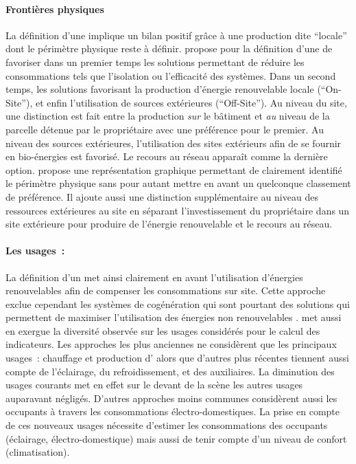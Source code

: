 \paragraph{Frontières physiques} %
\label{par:frontières_physiques}
La définition d’une  implique un bilan positif grâce à une production dite
\enquote{locale} dont le périmètre physique reste à définir.
\textcite{Torcellini2006} propose pour la définition d’une 
de favoriser dans un premier temps les solutions permettant de réduire les consommations
tels que l’isolation ou l’efficacité des systèmes. Dans un second temps, les solutions favorisant
la production d’énergie renouvelable locale (\enquote{On-Site}), et enfin
l’utilisation de sources extérieures (\enquote{Off-Site}). Au niveau du site, une
distinction est fait entre la production \emph{sur} le bâtiment et \emph{au} niveau de la
parcelle détenue par le propriétaire avec une préférence pour le premier.
Au niveau des sources extérieures, l’utilisation des sites extérieurs afin de se
fournir en bio-énergies est favorisé. Le recours au réseau apparaît comme la dernière option.
\textcite{Marszal2010} propose une représentation graphique permettant de clairement
identifié le périmètre physique sans pour autant mettre en avant un quelconque
classement de préférence. Il ajoute aussi une distinction supplémentaire au niveau
des ressources extérieures au site en séparant l’investissement du propriétaire dans
un site extérieure pour produire de l’énergie renouvelable et le recours au réseau.

\paragraph{Les usages~:} %
\label{par:les_usages}
La définition d’un  met ainsi clairement en avant l’utilisation d’énergies
renouvelables afin de compenser les consommations sur site. Cette approche exclue
cependant les systèmes de cogénération qui sont pourtant des solutions qui permettent
de maximiser l’utilisation des énergies non renouvelables \parencite{Sartori2010}.
\textcite{Marszal2011971} met aussi en exergue la diversité observée sur les usages considérés pour le calcul
des indicateurs. Les approches les plus anciennes ne considèrent que les principaux usages~: chauffage
et production d’ alors que d’autres plus récentes tiennent aussi compte de l’éclairage,
du refroidissement, et des auxiliaires. La diminution des usages courants met en effet
sur le devant de la scène les autres usages auparavant négligés. D’autres approches
moins communes considèrent aussi les occupants à travers les consommations électro-domestiques.
La prise en compte de ces nouveaux usages nécessite d’estimer les consommations des occupants
(éclairage, électro-domestique) mais aussi de tenir compte d’un niveau de confort (climatisation).



